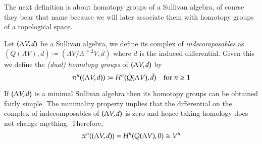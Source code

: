 The next definition is about homotopy groups of a Sullivan algebra, of course they bear that name because we will later
associate them with homotopy groups of a topological space.

\begin{Definition}
 Let $(\Lambda V,d)$ be a Sullivan algebra, we define its complex of \emph{indecomposables} as
 $(Q(\Lambda V),\bar{d}) \coloneqq (\Lambda V / \Lambda^{\geq 2} V , \bar{d})$ where $\bar{d}$ is the induced differential.
 Given this we define the \emph{(dual) homotopy groups} of $(\Lambda V,d)$ by 
 $$ \pi^n ( (\Lambda V,d)) \coloneqq H^n(Q(\Lambda V),\bar{d}) \quad \text{for $n \geq 1$}$$
\end{Definition}

\begin{Remark}
 If $(\Lambda V,d)$ is a minimal Sullivan algebra then its homotopy groups can be obtained fairly simple. The minimality property
 implies that the differential on the complex of indecomposables of $(\Lambda V,d)$ is zero and hence taking
 homology does not change anything. Therefore, 
 $$ \pi^n ( (\Lambda V,d)) = H^n(Q(\Lambda V),0) \cong V^n$$
\end{Remark}
